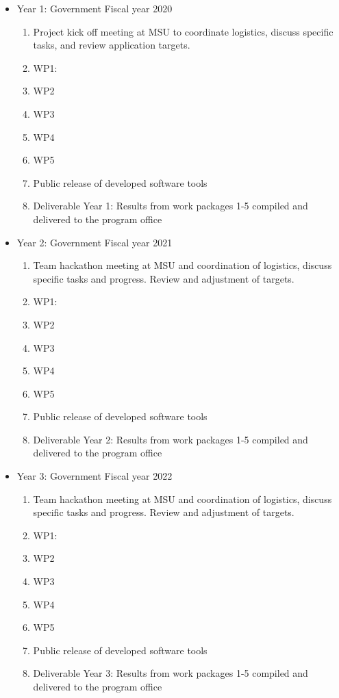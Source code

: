 \documentclass[10pt]{article}
\begin{document}
\begin{itemize}
    \item Year 1: Government Fiscal year 2020
    \begin{enumerate}
        \item Project kick off meeting at MSU to coordinate logistics, discuss
specific tasks, and review application targets.
\item WP1: 
\item WP2
\item WP3
\item WP4
\item WP5
\item Public release of developed software tools
\item Deliverable Year 1: Results from work packages 1-5 compiled and delivered to the program office
    \end{enumerate}
    \item Year 2: Government Fiscal year 2021
    \begin{enumerate}
        \item Team hackathon meeting at MSU and coordination of logistics, discuss specific tasks and progress. Review and adjustment of targets.
        \item WP1: 
\item WP2
\item WP3
\item WP4
\item WP5
\item Public release of developed software tools
\item Deliverable Year 2: Results from work packages 1-5 compiled and delivered to the program office
    \end{enumerate}
    \item Year 3: Government Fiscal year 2022
    \begin{enumerate}
        \item  Team hackathon meeting at MSU and coordination of logistics, discuss specific tasks and progress. Review and adjustment of targets.
        \item WP1: 
\item WP2
\item WP3
\item WP4
\item WP5
\item Public release of developed software tools
\item Deliverable Year 3: Results from work packages 1-5 compiled and delivered to the program office
    \end{enumerate}
    
\end{itemize}
\end{document}
